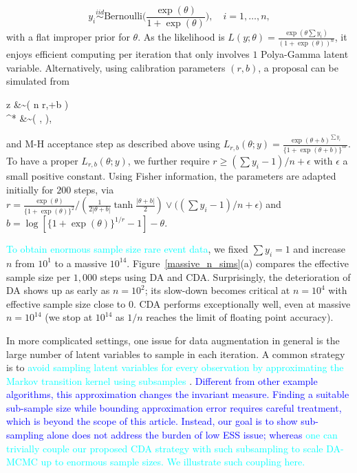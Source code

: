\documentclass[11pt]{article}
\newcommand{\leojames}[1]{\textcolor{blue}{#1}}
\newcommand{\dave}[1]{{\textcolor{cyan}{#1}}}
\newcommand{\be}{\begin{equs}}
\newcommand{\ee}{\end{equs}}
\newcommand{\No}{\text{No}}
\newcommand{\PG}{\text{PG}}
\newcommand{\Bern}{\text{Bernoulli}}
\begin{document}
$$y_i\stackrel{iid}{\sim} \Bern\Big(\frac{\exp(\theta)}{1+\exp(\theta)}\Big), \quad i=1,\ldots,n,$$
with a flat improper prior for $\theta$. As the likelihood is $L(y;\theta )= \frac{\exp(\theta\sum y_i)}{(1+\exp(\theta))^n} $, it enjoys efficient computing per iteration
that only involves $1$  Polya-Gamma latent variable. Alternatively, using calibration parameters $(r,b)$, a  proposal can be simulated from
\be
z &\sim \PG\left ( n r,\theta+b \right)\\
\theta^* &\sim \No \left( , \right),
\ee
and M-H acceptance step as described above using $L_{r,b}(\theta; y) = \frac{\exp(\theta+b)^{\sum y_i}}{\{ 1+\exp(\theta+b)\}^{nr}}$.
To have a proper $L_{r,b}(\theta;y)$, we further require $r \ge (\sum y_i-1)/n + \epsilon$ with $\epsilon$ a small positive constant. 
 Using Fisher information, the  parameters are adapted initially for $200$
 steps, via $r =\frac{\exp(\theta)}{ \{1+\exp(\theta)\} ^2} / \left (   \frac{1}{2 |\theta+b|} \tanh\frac{|\theta+b|}{2} \right) \vee \big ( (\sum y_i-1)/n + \epsilon \big)$ and $b=\log[  \{1+\exp(\theta)\}^{1/r} -1] - \theta$.

\dave{To obtain enormous sample size rare event data}, we fixed $\sum
y_i=1$ and increase $n$ from $10^1$ to a massive $10^{14}$. 
Figure~\ref{massive_n_sims}(a) compares the effective sample size per $1,000$
steps using DA and CDA. Surprisingly, the deterioration of DA shows up as early
as $n=10^2$; its slow-down becomes critical at $n=10^4$ with
effective sample size close to $0$. CDA performs exceptionally well, even
at massive $n=10^{14}$ (we stop at $10^{14}$ as $1/n$ reaches the limit of floating
point accuracy).

In more complicated settings, one issue for data augmentation in general is the large number of latent variables to sample in each iteration.  A common strategy is to \dave{avoid sampling latent variables for
every observation by approximating the Markov transition kernel using subsamples} 
\citep{quiroz2016exact,johndrow2015approximations}. \leojames{Different from other
example algorithms, this approximation changes the invariant measure. Finding
a suitable sub-sample size while bounding approximation
error requires careful treatment, which is beyond the scope of
this article. Instead, our goal is to show sub-sampling alone does not address the burden of low ESS issue; whereas }\dave{one can trivially couple our proposed CDA
strategy with such subsampling to scale DA-MCMC up to enormous sample sizes.  We illustrate such 
coupling here.}
\end{document}
